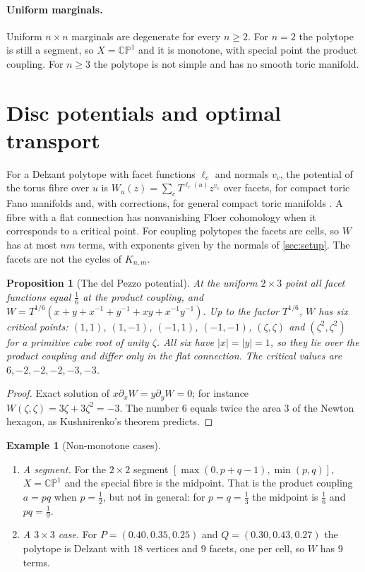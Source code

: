 \documentclass[11pt]{article}
\newtheorem{proposition}[theorem]{Proposition}
\theoremstyle{definition}
\newtheorem{example}[theorem]{Example}
\theoremstyle{remark}
\newcommand{\CP}{\mathbb{CP}}
\begin{document}
\paragraph{Uniform marginals.} Uniform $n\times n$ marginals are degenerate for every $n\ge2$. For $n=2$
the polytope is still a segment, so $X=\CP^1$ and it is monotone, with special point the product
coupling. For $n\ge3$ the polytope is not simple and has no smooth toric manifold.

\section{Disc potentials and optimal transport}\label{sec:potential}

For a Delzant polytope with facet functions $\ell_c$ and normals $v_c$, the potential of the torus fibre over
$u$ is $W_u(z)=\sum_cT^{\ell_c(u)}z^{v_c}$ over facets, for compact toric Fano manifolds \cite{ChoOh2006} and,
with corrections, for general compact toric manifolds \cite{FOOO2010}. A fibre with a flat connection has
nonvanishing Floer cohomology when it corresponds to a critical point. For coupling polytopes the facets
are cells, so $W$ has at most $nm$ terms, with exponents given by the normals of \cref{sec:setup}. The facets
are not the cycles of $K_{n,m}$.

\begin{proposition}[The del Pezzo potential]\label{prop:dp6}
At the uniform $2\times3$ point all facet functions equal $\tfrac16$ at the product coupling, and
$W=T^{1/6}(x+y+x^{-1}+y^{-1}+xy+x^{-1}y^{-1})$. Up to the factor $T^{1/6}$, $W$ has six critical points:
$(1,1)$, $(1,-1)$, $(-1,1)$, $(-1,-1)$, $(\zeta,\zeta)$ and $(\zeta^2,\zeta^2)$ for a primitive cube root of unity
$\zeta$. All six have $\lvert x\rvert=\lvert y\rvert=1$, so they lie over the product coupling and differ only in
the flat connection. The critical values are $6,-2,-2,-2,-3,-3$.
\end{proposition}
\begin{proof}
Exact solution of $x\partial_xW=y\partial_yW=0$; for instance $W(\zeta,\zeta)=3\zeta+3\zeta^2=-3$. The number $6$ equals twice the area $3$ of the Newton hexagon,
as Kushnirenko's theorem predicts.
\end{proof}

\begin{example}[Non-monotone cases]
\leavevmode
\begin{enumerate}[label=(\alph*),leftmargin=*]
\item \emph{A segment.} For the $2\times2$ segment $[\max(0,p+q-1),\min(p,q)]$, $X=\CP^1$ and the special fibre is
  the midpoint. That is the product coupling $a=pq$ when $p=\tfrac12$, but not in general: for
  $p=q=\tfrac13$ the midpoint is $\tfrac16$ and $pq=\tfrac19$.
\item \emph{A $3\times3$ case.} For $P=(0.40,0.35,0.25)$ and $Q=(0.30,0.43,0.27)$ the polytope is Delzant with $18$
  vertices and $9$ facets, one per cell, so $W$ has $9$ terms.
\end{enumerate}
\end{example}
\end{document}
